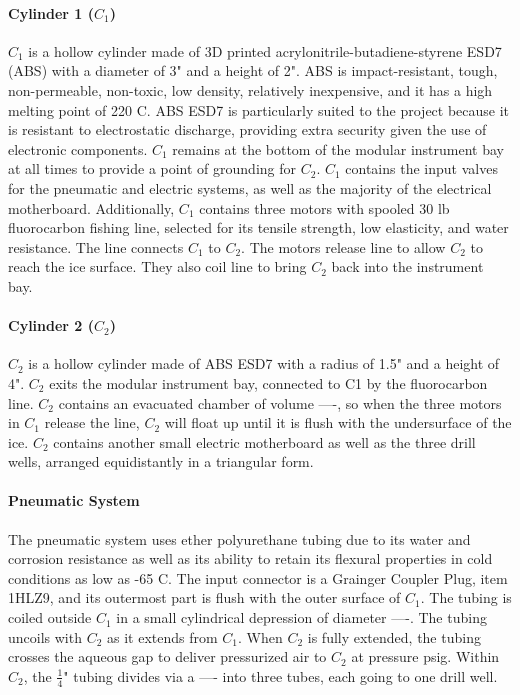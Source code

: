 \documentclass{article}
\begin{document}
\paragraph{Cylinder 1 ($C_1$)}

$C_1$ is a hollow cylinder made of 3D printed acrylonitrile-butadiene-styrene ESD7 (ABS) with a diameter of 3"  and a height of 2". ABS is impact-resistant, tough, non-permeable, non-toxic, low density, relatively inexpensive, and it has a high melting point of 220 C. ABS ESD7 is particularly suited to the project because it is resistant to electrostatic discharge, providing extra security given the use of electronic components. $C_1$ remains at the bottom of the modular instrument bay at all times to provide a point of grounding for $C_2$. $C_1$ contains the input valves for the pneumatic and electric systems, as well as the majority of the electrical motherboard. Additionally, $C_1$ contains three motors with spooled 30 lb fluorocarbon fishing line, selected for its tensile strength, low elasticity, and water resistance. The line connects $C_1$ to $C_2$. The motors release line to allow $C_2$ to reach the ice surface. They also coil line to bring $C_2$ back into the instrument bay.

\paragraph{Cylinder 2 ($C_2$)}
$C_2$ is a hollow cylinder made of ABS ESD7 with a radius of 1.5" and a height of 4". $C_2$ exits the modular instrument bay, connected to C1 by the fluorocarbon line. $C_2$ contains an evacuated chamber of volume ----, so when the three motors in $C_1$ release the line, $C_2$ will float up until it is flush with the undersurface of the ice. $C_2$ contains another small electric motherboard as well as the three drill wells, arranged equidistantly in a triangular form.
\paragraph{Pneumatic System}
The pneumatic system uses ether polyurethane tubing due to its water and corrosion resistance as well as its ability to retain its flexural properties in cold conditions as low as -65 C. The input connector is a Grainger Coupler Plug, item 1HLZ9, and its outermost part is flush with the outer surface of $C_1$. The tubing is coiled outside $C_1$ in a small cylindrical depression of diameter ----. The tubing uncoils with $C_2$ as it extends from $C_1$. When $C_2$ is fully extended, the tubing crosses the aqueous gap to deliver pressurized air to $C_2$ at pressure psig. Within $C_2$, the $\frac{1}{4}$" tubing divides via a ---- into three tubes, each going to one drill well.
\end{document}
